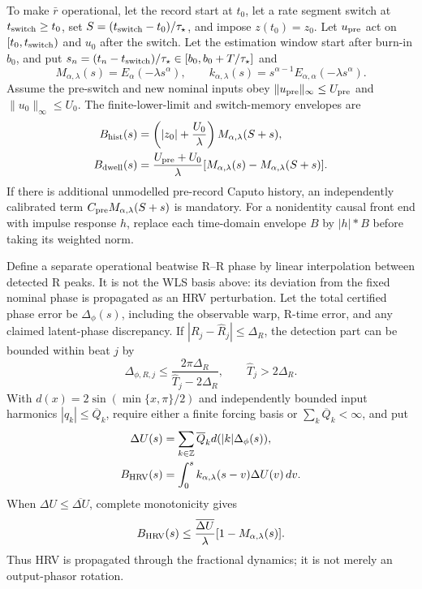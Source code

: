 \documentclass[11pt]{article}
\theoremstyle{definition}
\theoremstyle{remark}
\begin{document}
To make \(\bar r\) operational, let the record start at \(t_0\), let a rate
segment switch at \(t_{\rm switch}\ge t_0\), set
\(S=(t_{\rm switch}-t_0)/\tau_\star\), and impose \(z(t_0)=z_0\).  Let
\(u_{\rm pre}\) act on \([t_0,t_{\rm switch})\) and \(u_0\) after the switch.
Let the estimation window start after burn-in \(b_0\), and put
\(s_n=(t_n-t_{\rm switch})/\tau_\star\in[b_0,b_0+T/\tau_\star]\) and
\[
 M_{\alpha,\lambda}(s)=E_\alpha(-\lambda s^\alpha),\qquad
 k_{\alpha,\lambda}(s)=s^{\alpha-1}
 E_{\alpha,\alpha}(-\lambda s^\alpha).
\]
Assume the pre-switch and new nominal inputs obey
\(\|u_{\rm pre}\|_\infty\le U_{\rm pre}\) and
\(\|u_0\|_\infty\le U_0\).  The finite-lower-limit and switch-memory
envelopes are
\begin{align}
 B_{\rm hist}(s)
 &=\left(|z_0|+\frac{U_0}{\lambda}\right)
   M_{\alpha,\lambda}(S+s),\label{eq:hist}\\
 B_{\rm dwell}(s)
 &=\frac{U_{\rm pre}+U_0}{\lambda}
   [M_{\alpha,\lambda}(s)-M_{\alpha,\lambda}(S+s)].
 \label{eq:dwell}
\end{align}
If there is additional unmodelled pre-record Caputo history, an independently
calibrated term \(C_{\rm pre}M_{\alpha,\lambda}(S+s)\) is mandatory.  For a
nonidentity causal front end with impulse response \(h\), replace each
time-domain envelope \(B\) by \(|h|*B\) before taking its weighted norm.

Define a separate operational beatwise R--R phase by linear interpolation
between detected R peaks.  It is not the WLS basis above: its deviation from
the fixed nominal phase is propagated as an HRV perturbation.  Let the total
certified phase error be \(\Delta_\phi(s)\), including the observable warp,
R-time error, and any claimed latent-phase discrepancy.  If
\(|R_j-\widehat R_j|\le\Delta_R\), the detection part can be bounded within
beat \(j\) by
\[
 \Delta_{\phi,R,j}\le
 \frac{2\pi\Delta_R}{\widehat T_j-2\Delta_R},\qquad
 \widehat T_j>2\Delta_R.
\]
With \(d(x)=2\sin(\min\{x,\pi\}/2)\) and independently bounded input
harmonics \(|q_k|\le\overline Q_k\), require either a finite forcing basis or
\(\sum_k\overline Q_k<\infty\), and put
\begin{align}
 \Delta U(s)&=\sum_{k\in\mathbb Z}\overline Q_k
 d(|k|\Delta_\phi(s)),\label{eq:phase-input}\\
 B_{\rm HRV}(s)&=\int_0^s k_{\alpha,\lambda}(s-v)
 \Delta U(v)\,dv.\label{eq:hrv}
\end{align}
When \(\Delta U\le\overline{\Delta U}\), complete monotonicity gives
\[
 B_{\rm HRV}(s)\le
 \frac{\overline{\Delta U}}{\lambda}
 [1-M_{\alpha,\lambda}(s)].
\]
Thus HRV is propagated through the fractional dynamics; it is not merely an
output-phasor rotation.
\end{document}
